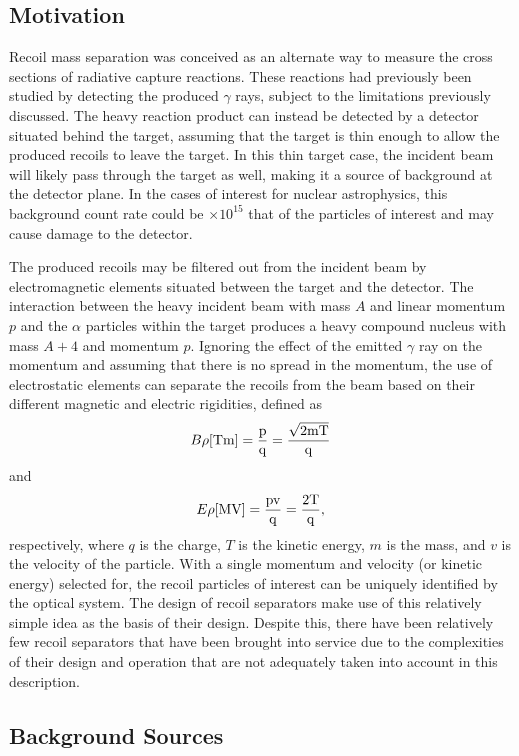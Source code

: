 \subsection{Motivation}

Recoil mass separation was conceived as an alternate way to measure the cross
sections of radiative capture reactions. These reactions had previously been
studied by detecting the produced $\gamma$ rays, subject to the limitations
previously discussed. The heavy reaction product can instead be detected by a
detector situated behind the target, assuming that the target is thin enough to
allow the produced recoils to leave the target. In this thin target case, the
incident beam will likely pass through the target as well, making it a source
of background at the detector plane. In the cases of interest for nuclear
astrophysics, this background count rate could be $\times 10^{15}$ that of the
particles of interest and may cause damage to the detector.

The produced recoils may be filtered out from the incident beam by
electromagnetic elements situated between the target and the detector. The
interaction between the heavy incident beam with mass $A$ and linear momentum
$p$ and the $\alpha$ particles within
the target produces a heavy compound nucleus with mass $A + 4$ and momentum
$p$. Ignoring the effect of the emitted $\gamma$ ray on the momentum and
assuming that there is no spread in the momentum, the use of electrostatic
elements can separate the recoils from the beam based on their different
magnetic and electric rigidities, defined as
\[
    B\rho\rm{ [Tm] } = \frac{p}{q} = \frac{\sqrt{2mT}}{q}
\]
and
\[
    E\rho\rm{ [MV] } = \frac{pv}{q} = \frac{2T}{q},
\]
respectively, where $q$ is the charge, $T$ is the kinetic energy, $m$ is the
mass, and $v$ is the velocity of the particle. With a single momentum and
velocity (or kinetic energy) selected for, the recoil particles of interest can
be uniquely identified by the optical system. The design of recoil separators
make use of this relatively simple idea as the basis of their design. Despite
this, there have been relatively few recoil separators that have been brought
into service due to the complexities of their design and operation that are not
adequately taken into account in this description.


\subsection{Background Sources}


